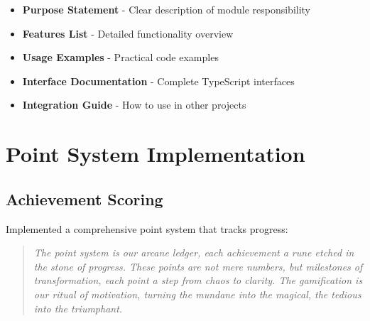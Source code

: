 \documentclass[11pt]{article}
\begin{document}
\begin{itemize}
\item \textbf{Purpose Statement} - Clear description of module responsibility
\item \textbf{Features List} - Detailed functionality overview
\item \textbf{Usage Examples} - Practical code examples
\item \textbf{Interface Documentation} - Complete TypeScript interfaces
\item \textbf{Integration Guide} - How to use in other projects
\end{itemize}

\section{Point System Implementation}

\subsection{Achievement Scoring}

Implemented a comprehensive point system that tracks progress:

\begin{quote}
\emph{The point system is our arcane ledger, each achievement a rune etched in the stone of progress. These points are not mere numbers, but milestones of transformation, each point a step from chaos to clarity. The gamification is our ritual of motivation, turning the mundane into the magical, the tedious into the triumphant.}
\end{quote}
\end{document}
